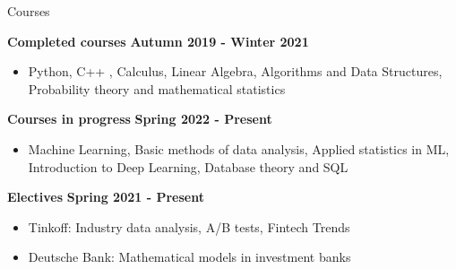 \documentclass{resume} %
\begin{document}
\begin{rSection}{Courses}

{\bf Completed courses}  \hfill {\bf Autumn 2019 - Winter 2021} 
\begin{itemize}
\item Python, C++ , Calculus, Linear Algebra, Algorithms and Data Structures, Probability theory and
mathematical statistics
\end{itemize}
{\bf Courses in progress}  \hfill {\bf Spring 2022 - Present} 
\begin{itemize}
\item Machine Learning, Basic methods of data analysis, Applied statistics in ML, Introduction to Deep Learning, Database theory and SQL
\end{itemize}
{\bf Electives}  \hfill {\bf Spring 2021 - Present} 
\begin{itemize}
\item Tinkoff: Industry data analysis, A/B tests, Fintech Trends
\item Deutsche Bank: Mathematical models in investment banks
\end{itemize}
\end{rSection}
\end{document}
